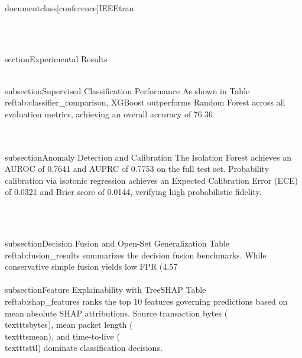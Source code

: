 \\documentclass[conference]{IEEEtran}
\begin{document}
\

\\section{Experimental Results}

\\subsection{Supervised Classification Performance}
As shown in Table~\\ref{tab:classifier_comparison}, XGBoost outperforms Random Forest across all evaluation metrics, achieving an overall accuracy of 76.36\\%

\

\\subsection{Anomaly Detection and Calibration}
The Isolation Forest achieves an AUROC of 0.7641 and AUPRC of 0.7753 on the full test set. Probability calibration via isotonic regression achieves an Expected Calibration Error (ECE) of 0.0321 and Brier score of 0.0144, verifying high probabilistic fidelity.

\

\\subsection{Decision Fusion and Open-Set Generalization}
Table~\\ref{tab:fusion_results} summarizes the decision fusion benchmarks. While conservative simple fusion yields low FPR (4.57\\%

\\subsection{Feature Explainability with TreeSHAP}
Table~\\ref{tab:shap_features} ranks the top 10 features governing predictions based on mean absolute SHAP attributions. Source transaction bytes (\\texttt{sbytes}), mean packet length (\\texttt{smean}), and time-to-live (\\texttt{sttl}) dominate classification decisions.
\end{document}

